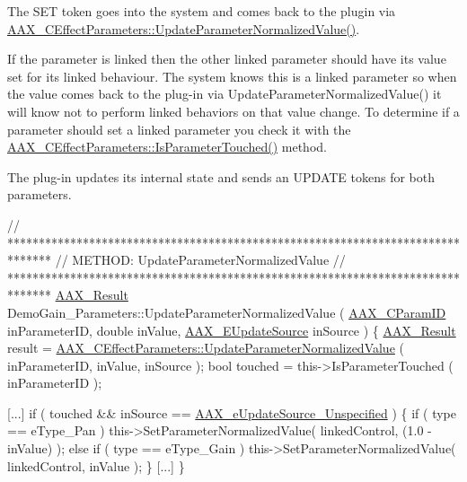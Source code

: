 \begin{DoxyEnumerate}
\item The S\+E\+T token goes into the system and comes back to the plugin via \hyperlink{a00018_a56a9f41a975b48f583655db7b43aae5a}{A\+A\+X\+\_\+\+C\+Effect\+Parameters\+::\+Update\+Parameter\+Normalized\+Value()}.
\begin{DoxyItemize}
\item If the parameter is linked then the other linked parameter should have its value set for its linked behaviour. The system knows this is a linked parameter so when the value comes back to the plug-\/in via Update\+Parameter\+Normalized\+Value() it will know not to perform linked behaviors on that value change. To determine if a parameter should set a linked parameter you check it with the \hyperlink{a00018_af5445bb9f40ccf826227199647e140ee}{A\+A\+X\+\_\+\+C\+Effect\+Parameters\+::\+Is\+Parameter\+Touched()} method.
\end{DoxyItemize}
\item The plug-\/in updates its internal state and sends an U\+P\+D\+A\+T\+E tokens for both parameters. 
\begin{DoxyCode}
\textcolor{comment}{// *******************************************************************************}
\textcolor{comment}{// METHOD:  UpdateParameterNormalizedValue}
\textcolor{comment}{// *******************************************************************************}
\hyperlink{a00149_a4d8f69a697df7f70c3a8e9b8ee130d2f}{AAX\_Result} DemoGain\_Parameters::UpdateParameterNormalizedValue ( 
      \hyperlink{a00149_a1440c756fe5cb158b78193b2fc1780d1}{AAX\_CParamID} inParameterID, \textcolor{keywordtype}{double} inValue, \hyperlink{a00206_a30be0398faf20c6b121239eb9399f3f7}{AAX\_EUpdateSource} inSource )
\{
    \hyperlink{a00149_a4d8f69a697df7f70c3a8e9b8ee130d2f}{AAX\_Result}    result = 
      \hyperlink{a00018_a56a9f41a975b48f583655db7b43aae5a}{AAX\_CEffectParameters::UpdateParameterNormalizedValue} 
      ( inParameterID, inValue, inSource );
    \textcolor{keywordtype}{bool}        touched = this->IsParameterTouched ( inParameterID );

    [...]
                \textcolor{keywordflow}{if} ( touched && inSource == \hyperlink{a00206_a30be0398faf20c6b121239eb9399f3f7aec16143f3916bad3c5a6d8eb60600a3b}{AAX\_eUpdateSource\_Unspecified} )
                \{
                    \textcolor{keywordflow}{if} ( type == eType\_Pan )
                        this->SetParameterNormalizedValue( linkedControl, (1.0 - inValue) );
                    \textcolor{keywordflow}{else} \textcolor{keywordflow}{if} ( type == eType\_Gain )
                        this->SetParameterNormalizedValue( linkedControl, inValue );
                \}
    [...]
\}
\end{DoxyCode}


\end{DoxyEnumerate}
